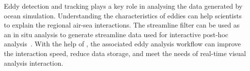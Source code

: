 Eddy detection and tracking plays a key role in analysing the data generated by ocean simulation. Understanding the characteristics of eddies can help scientists to explain the regional air-sea interactions.
The \vtkm streamline filter can be used as an in situ analysis to generate streamline data used for interactive post-hoc analysis~\cite{Han2022}. With the help of \vtkm, the associated eddy analysis workflow can improve the interaction speed, reduce data storage, and meet the
needs of real-time visual analysis interaction.  


